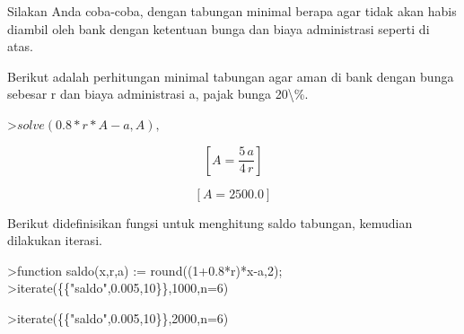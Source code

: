 \documentclass[12pt,arial,letterpaper]{book}
\begin{document}
\begin{eulernootebook}
\begin{eulercomment}
\begin{eulercomment}
\begin{eulernootebook}
\begin{eulercomment}
\begin{eulercomment}
\begin{eulercomment}
\begin{eulercomment}
\begin{eulercomment}
\begin{eulercomment}
\begin{eulernotebook}
\begin{eulercomment}
\begin{eulercomment}
\begin{eulercomment}
\begin{eulercomment}
\begin{eulercomment}
\begin{eulercomment}
\begin{eulercomment}
\begin{eulercomment}
\begin{eulercomment}
\begin{eulercomment}
\begin{eulercomment}
\begin{eulercomment}
\begin{eulercomment}
\begin{eulercomment}
\begin{eulercomment}
\begin{eulercomment}
\begin{eulercomment}
\begin{eulercomment}
\begin{eulercomment}
\begin{eulercomment}
\begin{eulercomment}
\begin{eulercomment}
\begin{eulercomment}
\begin{eulercomment}
\begin{eulercomment}
\begin{eulercomment}
\begin{eulercomment}
Silakan Anda coba-coba, dengan tabungan minimal berapa agar tidak akan
habis diambil oleh bank dengan ketentuan bunga dan biaya administrasi
seperti di atas.

Berikut adalah perhitungan minimal tabungan agar aman di bank dengan
bunga sebesar r dan biaya administrasi a, pajak bunga 20\textbackslash{}\%.
\end{eulercomment}
\begin{eulerprompt}
>$solve(0.8*r*A-a,A), $%
\end{eulerprompt}
\begin{eulerformula}
\[
\left[ A=\frac{5\,a}{4\,r} \right] 
\]
\end{eulerformula}
\begin{eulerformula}
\[
\left[ A=2500.0 \right] 
\]
\end{eulerformula}
\begin{eulercomment}
Berikut didefinisikan fungsi untuk menghitung saldo tabungan, kemudian
dilakukan iterasi.
\end{eulercomment}
\begin{eulerprompt}
>function saldo(x,r,a) := round((1+0.8*r)*x-a,2);
>iterate(\{\{"saldo",0.005,10\}\},1000,n=6)
\end{eulerprompt}
\begin{euleroutput}
  [1000,  994,  987.98,  981.93,  975.86,  969.76,  963.64]
\end{euleroutput}
\begin{eulerprompt}
>iterate(\{\{"saldo",0.005,10\}\},2000,n=6)
\end{eulerprompt}
\begin{euleroutput}
  [2000,  1998,  1995.99,  1993.97,  1991.95,  1989.92,  1987.88]
\end{euleroutput}

\end{eulercomment}
\end{eulercomment}
\end{eulercomment}
\end{eulercomment}
\end{eulercomment}
\end{eulercomment}
\end{eulercomment}
\end{eulercomment}
\end{eulercomment}
\end{eulercomment}
\end{eulercomment}
\end{eulercomment}
\end{eulercomment}
\end{eulercomment}
\end{eulercomment}
\end{eulercomment}
\end{eulercomment}
\end{eulercomment}
\end{eulercomment}
\end{eulercomment}
\end{eulercomment}
\end{eulercomment}
\end{eulercomment}
\end{eulercomment}
\end{eulercomment}
\end{eulercomment}
\end{eulernotebook}
\end{eulercomment}
\end{eulercomment}
\end{eulercomment}
\end{eulercomment}
\end{eulercomment}
\end{eulercomment}
\end{eulernootebook}
\end{eulercomment}
\end{eulercomment}
\end{eulernootebook}
\end{document}
